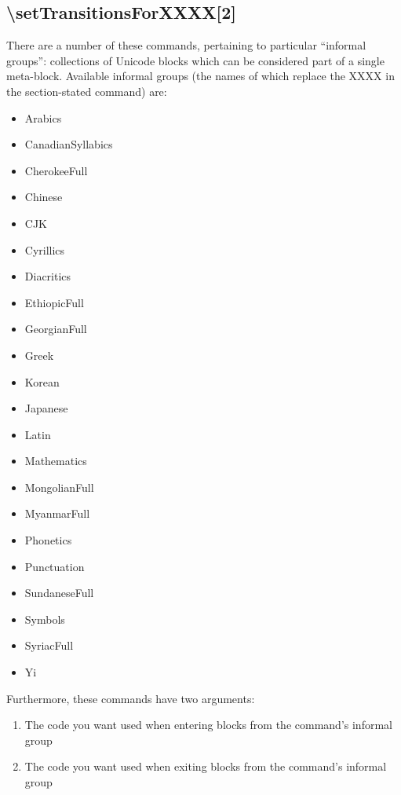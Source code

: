 \documentclass{article}
\newenvironment{itemlist}{%
  \begin{itemize}
  \setlength{\itemsep}{0pt}
  \setlength{\parsep}{0pt}
  \setlength{\topsep}{0pt}
  \setlength{\partopsep}{0pt}
  \setlength{\parskip}{0pt}
  \setlength{\labelsep}{5pt}}%
{
  \end{itemize}}
\newenvironment{numberlist}{%
  \begin{enumerate}
  \setlength{\itemsep}{0pt}
  \setlength{\parsep}{0pt}
  \setlength{\topsep}{0pt}
  \setlength{\partopsep}{0pt}
  \setlength{\parskip}{0pt}
  \setlength{\labelsep}{5pt}}%
{
  \end{enumerate}}
\begin{document}
    \subsection{\textbackslash setTransitionsForXXXX[2]}

      There are a number of these commands, pertaining to particular “informal groups”: collections of Unicode blocks which can be considered part of a single meta-block. Available informal groups (the names of which replace the XXXX in the section-stated command) are:

      \begin{itemlist}
        \item Arabics
        \item CanadianSyllabics
        \item CherokeeFull
        \item Chinese
        \item CJK
        \item Cyrillics
        \item Diacritics
        \item EthiopicFull
        \item GeorgianFull
        \item Greek
        \item Korean
        \item Japanese
        \item Latin
        \item Mathematics
        \item MongolianFull
        \item MyanmarFull
        \item Phonetics
        \item Punctuation
        \item SundaneseFull
        \item Symbols
        \item SyriacFull
        \item Yi
      \end{itemlist}

      Furthermore, these commands have two arguments:

      \begin{numberlist}
        \item The code you want used when entering blocks from the command's informal group
        \item The code you want used when exiting blocks from the command's informal group
      \end{numberlist}
\end{document}
